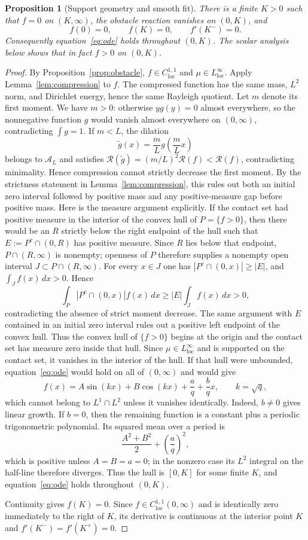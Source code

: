 \documentclass[11pt]{amsart}
\newtheorem{proposition}[theorem]{Proposition}
\theoremstyle{definition}
\theoremstyle{remark}
\newcommand{\A}{\mathcal A}
\newcommand{\Rcal}{\mathcal R}
\begin{document}
\begin{proposition}[Support geometry and smooth fit]\label{prop:geometry}
There is a finite $K>0$ such that $f=0$ on $(K,\infty)$, the obstacle reaction vanishes on $(0,K)$, and
\[
 f(0)=0,
 \qquad f(K)=0,
 \qquad f'(K^-)=0.
\]
Consequently equation~\eqref{eq:ode} holds throughout $(0,K)$. The scalar analysis below shows that in fact $f>0$ on $(0,K)$.
\end{proposition}
\begin{proof}
By Proposition~\ref{prop:obstacle}, $f\in C^{1,1}_{\mathrm{loc}}$ and $\mu\in L^\infty_{\mathrm{loc}}$. Apply Lemma~\ref{lem:compression} to $f$. The compressed function has the same mass, $L^2$ norm, and Dirichlet energy, hence the same Rayleigh quotient. Let $m$ denote its first moment. We have $m>0$: otherwise $yg(y)=0$ almost everywhere, so the nonnegative
function $g$ would vanish almost everywhere on $(0,\infty)$, contradicting
$\int g=1$. If $m<L$, the dilation
\[
 \widetilde g(x)=\frac{m}{L}g\left(\frac{m}{L}x\right)
\]
belongs to $\A_L$ and satisfies
$\Rcal(\widetilde g)=(m/L)^2\Rcal(f)<\Rcal(f)$, contradicting minimality.
Hence compression cannot strictly decrease the first moment. By the strictness
statement in Lemma~\ref{lem:compression}, this rules out both an initial zero
interval followed by positive mass and any positive-measure gap before
positive mass. Here is the measure argument explicitly. If the contact set
had positive measure in the interior of the convex hull of $P=\{f>0\}$, then
there would be an $R$ strictly below the right endpoint of the hull such that
$E:=P^c\cap(0,R)$ has positive measure. Since $R$ lies below that endpoint,
$P\cap(R,\infty)$ is nonempty; openness of $P$ therefore supplies a nonempty
open interval $J\subset P\cap(R,\infty)$.
For every $x\in J$ one has
$|P^c\cap(0,x)|\geq|E|$, and
$\int_J f(x)\,dx>0$. Hence
\[
 \int_P|P^c\cap(0,x)|f(x)\,dx
 \geq |E|\int_J f(x)\,dx>0,
\]
contradicting the absence of strict moment decrease. The same argument with
$E$ contained in an initial zero interval rules out a positive left endpoint
of the convex hull. Thus the convex hull of $\{f>0\}$ begins at the origin and
the contact set has measure zero inside that hull. Since
$\mu\in L^\infty_{\mathrm{loc}}$ and is supported on the contact set, it
vanishes in the interior of the hull. If that hull were unbounded,
equation~\eqref{eq:ode} would hold on all of $(0,\infty)$ and would give
\[
 f(x)=A\sin(kx)+B\cos(kx)+\frac{a}{q}+\frac{b}{q}x,
 \qquad k=\sqrt q,
\]
which cannot belong to $L^1\cap L^2$ unless it vanishes identically. Indeed,
$b\neq0$ gives linear growth. If $b=0$, then the remaining function is a
constant plus a periodic trigonometric polynomial. Its squared mean over a
period is
\[
 \frac{A^2+B^2}{2}+\left(\frac aq\right)^2,
\]
which is positive unless $A=B=a=0$; in the nonzero case its $L^2$ integral on
the half-line therefore diverges. Thus the hull is $[0,K]$ for some finite
$K$, and equation~\eqref{eq:ode} holds throughout $(0,K)$.

Continuity gives $f(K)=0$. Since
$f\in C^{1,1}_{\mathrm{loc}}(0,\infty)$ and is identically zero immediately
to the right of $K$, its derivative is continuous at the interior point $K$ and
$f'(K^-)=f'(K^+)=0$.
\end{proof}
\end{document}
